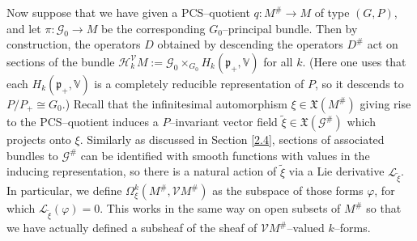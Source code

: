 \documentclass[12pt,a4paper]{amsart}
\def\frak{\mathfrak}
\def\Bbb{\mathbb}
\def\Cal{\mathcal}
\let\phi\varphi
\newcommand{\x}{\times}
\newcommand{\ph}{\phi}
\newcommand{\Om}{\Omega}
\numberwithin{theorem}{section}
\theoremstyle{definition}
\theoremstyle{remark}
\begin{document}
Now suppose that we have given a PCS--quotient $q:M^\#\to M$ of type
$(G,P)$, and let $\pi:\Cal G_0\to M$ be the corresponding
$G_0$--principal bundle. Then by construction, the operators $D$
obtained by descending the operators $D^\#$ act on sections of the
bundle $\Cal H^{\Cal V}_kM:=\Cal G_0\x_{G_0}H_k(\frak p_+,\Bbb V)$ for
all $k$. (Here one uses that each $H_k(\frak p_+,\Bbb V)$ is a
completely reducible representation of $P$, so it descends to
$P/P_+\cong G_0$.) Recall that the infinitesimal automorphism
$\xi\in\frak X(M^\#)$ giving rise to the PCS--quotient induces a
$P$--invariant vector field $\tilde\xi\in\frak X(\Cal G^\#)$ which
projects onto $\xi$. Similarly as discussed in Section \ref{2.4},
sections of associated bundles to $\Cal G^\#$ can be identified with
smooth functions with values in the inducing representation, so there
is a natural action of $\tilde\xi$ via a Lie derivative $\Cal
L_{\tilde\xi}$. In particular, we define $\Om^k_\xi (M^\#,\Cal VM^\#)$
as the subspace of those forms $\ph$, for which $\Cal
L_{\tilde\xi}(\ph)=0$. This works in the same way on open subsets of
$M^\#$ so that we have actually defined a subsheaf of the sheaf of
$\Cal VM^\#$--valued $k$--forms.
\end{document}
